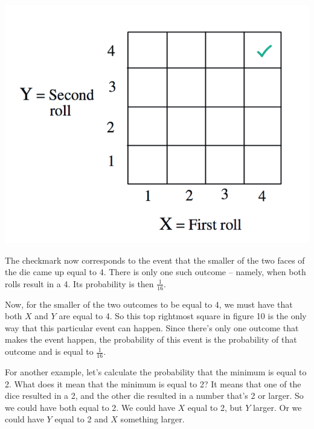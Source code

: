\documentclass{tufte-handout}
\begin{document}
\begin{marginfigure}
  \includegraphics{CheckMarkedDie2}
  \caption{The checkmark now corresponds to the event that the smaller of the two faces of the die came up equal to 4. There is only one such outcome -- namely, when both rolls result in a 4. Its probability is then $\frac{1}{16}.$ }
\end{marginfigure}

Now, for the smaller of the two outcomes to be equal to 4, we must have that both $X$ and $Y$ are equal to
4. So this top rightmost square in figure 10 is the only way that this particular event can happen. Since there's only one
outcome that makes the event happen, the probability of this event is the probability of that outcome
and is equal to $\frac{1}{16}$.

\pagebreak
For another example, let's calculate the probability that the minimum is equal to 2. What does it mean
that the minimum is equal to 2? It means that one of the dice resulted in a 2, and the other die resulted
in a number that's 2 or larger. So we could have both equal to 2. We could have $X$ equal to 2, but $Y$
larger. Or we could have $Y$ equal to 2 and $X$ something larger.
\end{document}

